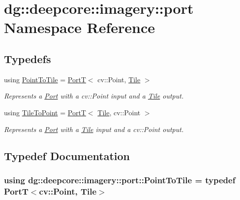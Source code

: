 \hypertarget{namespacedg_1_1deepcore_1_1imagery_1_1port}{}\section{dg\+:\+:deepcore\+:\+:imagery\+:\+:port Namespace Reference}
\label{namespacedg_1_1deepcore_1_1imagery_1_1port}
\subsection*{Typedefs}
\begin{DoxyCompactItemize}
\item 
using \hyperlink{namespacedg_1_1deepcore_1_1imagery_1_1port_ab85e0ca90a4630aee78454ef007e07a6}{Point\+To\+Tile} = \hyperlink{structdg_1_1deepcore_1_1_port_t}{PortT}$<$ cv\+::\+Point, \hyperlink{structdg_1_1deepcore_1_1imagery_1_1_tile}{Tile} $>$
\begin{DoxyCompactList}\small\item\em Represents a \hyperlink{classdg_1_1deepcore_1_1_port}{Port} with a cv\+::\+Point input and a \hyperlink{structdg_1_1deepcore_1_1imagery_1_1_tile}{Tile} output. \end{DoxyCompactList}\item 
using \hyperlink{namespacedg_1_1deepcore_1_1imagery_1_1port_af86fdf47c5bc8b5bd694c08cb2f3b7ac}{Tile\+To\+Point} = \hyperlink{structdg_1_1deepcore_1_1_port_t}{PortT}$<$ \hyperlink{structdg_1_1deepcore_1_1imagery_1_1_tile}{Tile}, cv\+::\+Point $>$
\begin{DoxyCompactList}\small\item\em Represents a \hyperlink{classdg_1_1deepcore_1_1_port}{Port} with a \hyperlink{structdg_1_1deepcore_1_1imagery_1_1_tile}{Tile} input and a cv\+::\+Point output. \end{DoxyCompactList}\end{DoxyCompactItemize}


\subsection{Typedef Documentation}
\subsubsection[{\texorpdfstring{Point\+To\+Tile}{PointToTile}}]{\setlength{\rightskip}{0pt plus 5cm}using {\bf dg\+::deepcore\+::imagery\+::port\+::\+Point\+To\+Tile} = typedef {\bf PortT}$<$cv\+::\+Point, {\bf Tile}$>$}\hypertarget{namespacedg_1_1deepcore_1_1imagery_1_1port_ab85e0ca90a4630aee78454ef007e07a6}{}\label{namespacedg_1_1deepcore_1_1imagery_1_1port_ab85e0ca90a4630aee78454ef007e07a6}



